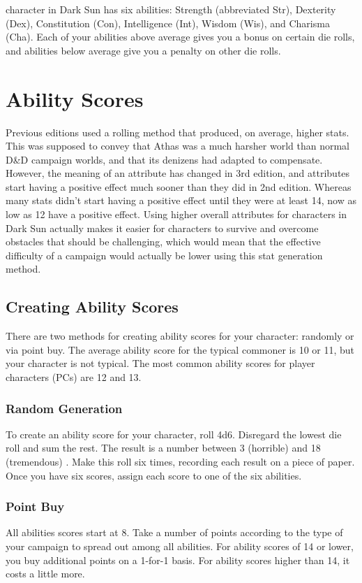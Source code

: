 \documentclass[10pt,a4paper,twocolumn]{d20}
\begin{document}
 character in Dark Sun has six abilities: Strength (abbreviated Str), Dexterity (Dex), Constitution (Con), Intelligence (Int), Wisdom (Wis), and Charisma (Cha). Each of your abilities above average gives you a bonus on certain die rolls, and abilities below average give you a penalty on other die rolls.

\section{Ability Scores}

Previous editions used a rolling method that produced, on average, higher stats. This was supposed to convey that Athas was a much harsher world than normal D\&D campaign worlds, and that its denizens had adapted to compensate. However, the meaning of an attribute has changed in 3rd edition, and attributes start having a positive effect much sooner than they did in 2nd edition. Whereas many stats didn’t start having a positive effect until they were at least 14, now as low as 12 have a positive effect. Using higher overall attributes for characters in Dark Sun actually makes it easier for characters to survive and overcome obstacles that should be challenging, which would mean that the effective difficulty of a campaign would actually be lower using this stat generation method.

\subsection{Creating Ability Scores}
There are two methods for creating ability scores for your character: randomly or via point buy.  The average ability score for the typical commoner is 10 or 11, but your character is not typical. The most common ability scores for player characters (PCs) are 12 and 13.

\subsubsection{Random Generation}
To create an ability score for your character, roll 4d6. Disregard the lowest die roll and sum the rest. The result is a number between 3 (horrible) and 18 (tremendous)
.
Make this roll six times, recording each result on a piece of paper. Once you have six scores, assign each score to one of the six abilities.

\subsubsection{Point Buy}
All abilities scores start at 8. Take a number of points according to the type of your campaign to spread out among all abilities. For ability scores of 14 or lower, you buy additional points on a 1-for-1 basis. For ability scores higher than 14, it costs a little more.
\end{document}
